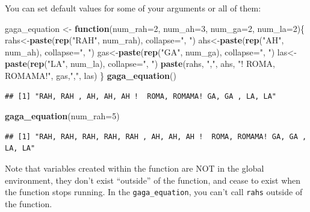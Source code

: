 \documentclass[]{article}
\newenvironment{Shaded}{\begin{snugshade}}{\end{snugshade}}
\newcommand{\KeywordTok}[1]{\textcolor[rgb]{0.13,0.29,0.53}{\textbf{#1}}}
\newcommand{\DataTypeTok}[1]{\textcolor[rgb]{0.13,0.29,0.53}{#1}}
\newcommand{\DecValTok}[1]{\textcolor[rgb]{0.00,0.00,0.81}{#1}}
\newcommand{\StringTok}[1]{\textcolor[rgb]{0.31,0.60,0.02}{#1}}
\newcommand{\ControlFlowTok}[1]{\textcolor[rgb]{0.13,0.29,0.53}{\textbf{#1}}}
\newcommand{\NormalTok}[1]{#1}
\begin{document}
You can set default values for some of your arguments or all of them:

\begin{Shaded}
\begin{Highlighting}[]
\NormalTok{gaga_equation <-}\StringTok{ }\ControlFlowTok{function}\NormalTok{(}\DataTypeTok{num_rah=}\DecValTok{2}\NormalTok{, }\DataTypeTok{num_ah=}\DecValTok{3}\NormalTok{, }\DataTypeTok{num_ga=}\DecValTok{2}\NormalTok{, }\DataTypeTok{num_la=}\DecValTok{2}\NormalTok{)\{}
\NormalTok{  rahs<-}\KeywordTok{paste}\NormalTok{(}\KeywordTok{rep}\NormalTok{(}\StringTok{"RAH"}\NormalTok{, num_rah), }\DataTypeTok{collapse=}\StringTok{", "}\NormalTok{)}
\NormalTok{  ahs<-}\KeywordTok{paste}\NormalTok{(}\KeywordTok{rep}\NormalTok{(}\StringTok{"AH"}\NormalTok{, num_ah), }\DataTypeTok{collapse=}\StringTok{", "}\NormalTok{)}
\NormalTok{  gas<-}\KeywordTok{paste}\NormalTok{(}\KeywordTok{rep}\NormalTok{(}\StringTok{"GA"}\NormalTok{, num_ga), }\DataTypeTok{collapse=}\StringTok{", "}\NormalTok{)}
\NormalTok{  las<-}\KeywordTok{paste}\NormalTok{(}\KeywordTok{rep}\NormalTok{(}\StringTok{"LA"}\NormalTok{, num_la), }\DataTypeTok{collapse=}\StringTok{", "}\NormalTok{)}
  \KeywordTok{paste}\NormalTok{(rahs, }\StringTok{","}\NormalTok{, ahs,  }\StringTok{"!  ROMA, ROMAMA!"}\NormalTok{, gas,}\StringTok{","}\NormalTok{, las)}
\NormalTok{\}}
\KeywordTok{gaga_equation}\NormalTok{()}
\end{Highlighting}
\end{Shaded}

\begin{verbatim}
## [1] "RAH, RAH , AH, AH, AH !  ROMA, ROMAMA! GA, GA , LA, LA"
\end{verbatim}

\begin{Shaded}
\begin{Highlighting}[]
\KeywordTok{gaga_equation}\NormalTok{(}\DataTypeTok{num_rah=}\DecValTok{5}\NormalTok{)}
\end{Highlighting}
\end{Shaded}

\begin{verbatim}
## [1] "RAH, RAH, RAH, RAH, RAH , AH, AH, AH !  ROMA, ROMAMA! GA, GA , LA, LA"
\end{verbatim}

Note that variables created within the function are NOT in the global
environment, they don't exist ``outside'' of the function, and cease to
exist when the function stops running. In the \texttt{gaga\_equation},
you can't call \texttt{rahs} outside of the function.
\end{document}
